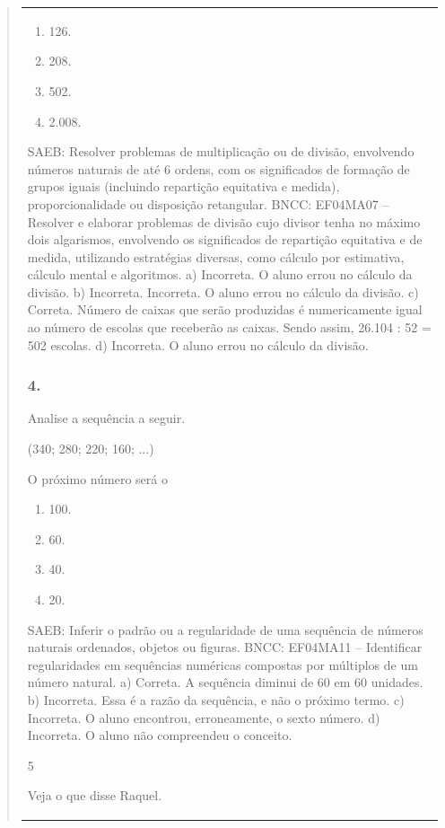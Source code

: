 \begin{mdframed}[linewidth=2pt,linecolor=salmao,roundcorner=2pt]
\begin{itemize}
{\begin{itemize}
\begin{escolha}
{\begin{quote}
{\begin{escolha}
{{{{{\begin{longtable}[]{@{}l@{}}
\begin{itemize}
{\begin{enumerate}
\item
  126.
\item
  208.
\item
  502.
\item
  2.008.
\end{enumerate}

SAEB: Resolver problemas de multiplicação ou de divisão,
envolvendo números naturais de até 6 ordens, com os significados de
formação de grupos iguais (incluindo repartição equitativa e medida),
proporcionalidade ou disposição retangular.
BNCC: EF04MA07 -- Resolver e elaborar problemas de divisão cujo divisor tenha no máximo dois algarismos,
envolvendo os significados de repartição equitativa e de medida, utilizando estratégias diversas,
como cálculo por estimativa, cálculo mental e algoritmos.
a) Incorreta. O aluno errou no cálculo da divisão.
b) Incorreta. Incorreta. O aluno errou no cálculo da divisão.
c) Correta. Número de caixas que serão produzidas é numericamente igual ao número de
escolas que receberão as caixas. Sendo assim, 26.104 : 52 = 502 escolas.
d) Incorreta. O aluno errou no cálculo da divisão.

\subsubsection{4. }

Analise a sequência a seguir.

(340; 280; 220; 160; ...)

 O próximo número será o

\begin{enumerate}
\item
  100.
\item
  60.
\item
  40.
\item
  20.
\end{enumerate}

SAEB: Inferir o padrão ou a regularidade de uma sequência de
números naturais ordenados, objetos ou figuras.
BNCC: EF04MA11 -- Identificar regularidades em sequências numéricas compostas por múltiplos de um
número natural.
a) Correta. A sequência diminui de 60 em 60 unidades.
b) Incorreta. Essa é a razão da sequência, e não o próximo termo.
c) Incorreta. O aluno encontrou, erroneamente, o sexto número.
d) Incorreta. O aluno não compreendeu o conceito.

\num{5}

Veja o que disse Raquel.

}
\end{itemize}
\end{longtable}}}}}}
\end{escolha}}
\end{quote}}
\end{escolha}
\end{itemize}}
\end{itemize}
\end{mdframed}
